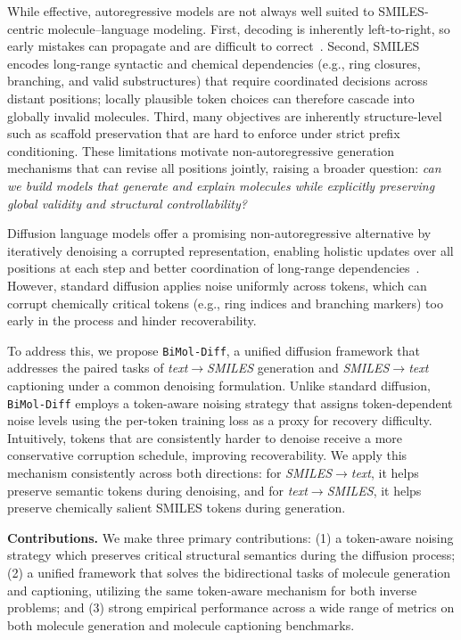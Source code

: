 \noindent While effective, autoregressive models are not always well suited to SMILES-centric molecule--language modeling. 
First, decoding is inherently left-to-right, so early mistakes can propagate and are difficult to correct~\cite{nie2025largelanguagediffusionmodels,arriola2025blockdiffusioninterpolatingautoregressive}. 
Second, SMILES encodes long-range syntactic and chemical dependencies (e.g., ring closures, branching, and valid substructures) that require coordinated decisions across distant positions; locally plausible token choices can therefore cascade into globally invalid molecules. 
Third, many objectives are inherently structure-level such as scaffold preservation that are hard to enforce under strict prefix conditioning. 
These limitations motivate non-autoregressive generation mechanisms that can revise all positions jointly, raising a broader question: \emph{can we build models that generate and explain molecules while explicitly preserving global validity and structural controllability?}

\noindent Diffusion language models offer a promising non-autoregressive alternative by iteratively denoising a corrupted representation, enabling holistic updates over all positions at each step and better coordination of long-range dependencies~\cite{li2022diffusionlmimprovescontrollabletext,nie2025largelanguagediffusionmodels}. However, standard diffusion applies noise uniformly across tokens, which can corrupt chemically critical tokens (e.g., ring indices and branching markers) too early in the process and hinder recoverability.

\noindent To address this, we propose \texttt{BiMol-Diff}, a unified diffusion framework that addresses the paired tasks of \emph{text}$\rightarrow$\emph{SMILES} generation and \emph{SMILES}$\rightarrow$\emph{text} captioning under a common denoising formulation. Unlike standard diffusion, \texttt{BiMol-Diff} employs a token-aware noising strategy that assigns token-dependent noise levels using the per-token training loss as a proxy for recovery difficulty. Intuitively, tokens that are consistently harder to denoise receive a more conservative corruption schedule, improving recoverability. We apply this mechanism consistently across both directions: for \emph{SMILES}$\rightarrow$\emph{text}, it helps preserve semantic tokens during denoising, and for \emph{text}$\rightarrow$\emph{SMILES}, it helps preserve chemically salient SMILES tokens during generation.

\noindent \textbf{Contributions.} We make three primary contributions: (1) a token-aware noising strategy which preserves critical structural semantics during the diffusion process; (2) a unified framework that solves the bidirectional tasks of molecule generation and captioning, utilizing the same token-aware mechanism for both inverse problems; and (3) strong empirical performance across a wide range of metrics on both molecule generation and molecule captioning benchmarks.